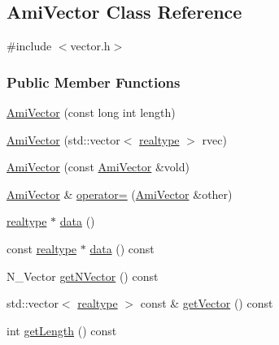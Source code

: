 \hypertarget{classamici_1_1_ami_vector}{}\subsection{Ami\+Vector Class Reference}
\label{classamici_1_1_ami_vector}


{\ttfamily \#include $<$vector.\+h$>$}

\subsubsection*{Public Member Functions}
\begin{DoxyCompactItemize}
\item 
\mbox{\hyperlink{classamici_1_1_ami_vector_a843c8e8dfc2642218e9f42d86d42c28c}{Ami\+Vector}} (const long int length)
\item 
\mbox{\hyperlink{classamici_1_1_ami_vector_a8ef9433b11b0d14c32e2e4ce18fe055e}{Ami\+Vector}} (std\+::vector$<$ \mbox{\hyperlink{namespaceamici_a1bdce28051d6a53868f7ccbf5f2c14a3}{realtype}} $>$ rvec)
\item 
\mbox{\hyperlink{classamici_1_1_ami_vector_a3202c4cf34466ec28baece9cf1eae880}{Ami\+Vector}} (const \mbox{\hyperlink{classamici_1_1_ami_vector}{Ami\+Vector}} \&vold)
\item 
\mbox{\hyperlink{classamici_1_1_ami_vector}{Ami\+Vector}} \& \mbox{\hyperlink{classamici_1_1_ami_vector_a7a677e5cfe8a63b315bd2fdf7992ede7}{operator=}} (\mbox{\hyperlink{classamici_1_1_ami_vector}{Ami\+Vector}} \&other)
\item 
\mbox{\hyperlink{namespaceamici_a1bdce28051d6a53868f7ccbf5f2c14a3}{realtype}} $\ast$ \mbox{\hyperlink{classamici_1_1_ami_vector_aee17a5447b8e03180f89a2a8acbd572f}{data}} ()
\item 
const \mbox{\hyperlink{namespaceamici_a1bdce28051d6a53868f7ccbf5f2c14a3}{realtype}} $\ast$ \mbox{\hyperlink{classamici_1_1_ami_vector_a8045bd641b2f456cdbf99d0c12bb9218}{data}} () const
\item 
N\+\_\+\+Vector \mbox{\hyperlink{classamici_1_1_ami_vector_acf288b105b2fa4520d0d73f828687533}{get\+N\+Vector}} () const
\item 
std\+::vector$<$ \mbox{\hyperlink{namespaceamici_a1bdce28051d6a53868f7ccbf5f2c14a3}{realtype}} $>$ const  \& \mbox{\hyperlink{classamici_1_1_ami_vector_a5f73cf1c7b6769c44dfb51b048ec4d63}{get\+Vector}} () const
\item 
int \mbox{\hyperlink{classamici_1_1_ami_vector_a5f00d4dc3e7866d193ce926f35542801}{get\+Length}} () const

\end{DoxyCompactItemize}
